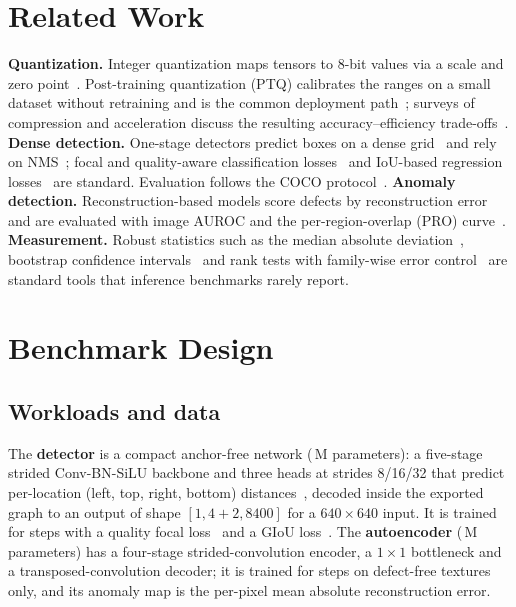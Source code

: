 \documentclass[conference]{IEEEtran}
\begin{document}
\section{Related Work}
\textbf{Quantization.} Integer quantization maps tensors to 8-bit values via a scale and zero point~\cite{jacob2018quantization}.
Post-training quantization (PTQ) calibrates the ranges on a small dataset without retraining and is the common
deployment path~\cite{krishnamoorthi2018quantizing,nagel2021white,gholami2022survey}; surveys of compression and
acceleration discuss the resulting accuracy--efficiency trade-offs~\cite{deng2020model}.
\textbf{Dense detection.} One-stage detectors predict boxes on a dense grid~\cite{redmon2018yolov3,tian2019fcos} and
rely on NMS~\cite{neubeck2006efficient,bodla2017soft}; focal and quality-aware classification losses~\cite{lin2017focal,li2020gfl}
and IoU-based regression losses~\cite{rezatofighi2019giou} are standard. Evaluation follows the COCO protocol~\cite{lin2014coco}.
\textbf{Anomaly detection.} Reconstruction-based models score defects by reconstruction error and are evaluated with
image AUROC and the per-region-overlap (PRO) curve~\cite{bergmann2019mvtec}.
\textbf{Measurement.} Robust statistics such as the median absolute deviation~\cite{leys2013detecting}, bootstrap
confidence intervals~\cite{efron1994introduction} and rank tests with family-wise error control~\cite{wilcoxon1945individual,holm1979simple}
are standard tools that inference benchmarks rarely report.

\section{Benchmark Design}

\subsection{Workloads and data}
The \textbf{detector} is a compact anchor-free network (\,M parameters): a five-stage strided
Conv-BN-SiLU backbone and three heads at strides 8/16/32 that predict per-location (left, top, right, bottom)
distances~\cite{tian2019fcos}, decoded inside the exported graph to an output of shape $[1, 4{+}2, 8400]$ for a
$640{\times}640$ input. It is trained for  steps with a quality focal loss~\cite{li2020gfl} and a
GIoU loss~\cite{rezatofighi2019giou}. The \textbf{autoencoder} (\,M parameters) has a four-stage
strided-convolution encoder, a $1{\times}1$ bottleneck and a transposed-convolution decoder; it is trained for
 steps on defect-free textures only, and its anomaly map is the per-pixel mean absolute
reconstruction error.
\end{document}
